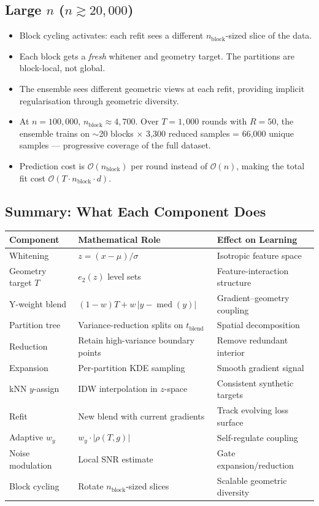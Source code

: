 \documentclass[11pt,a4paper]{article}
\newcommand{\med}{\operatorname{med}}
\theoremstyle{definition}
\begin{document}
\subsection{Large $n$ ($n \gtrsim 20{,}000$)}

\begin{itemize}[nosep]
    \item Block cycling activates: each refit sees a different $n_{\text{block}}$-sized
        slice of the data.
    \item Each block gets a \emph{fresh} whitener and geometry target.  The partitions
        are block-local, not global.
    \item The ensemble sees different geometric views at each refit, providing
        implicit regularisation through geometric diversity.
    \item At $n = 100{,}000$, $n_{\text{block}} \approx 4{,}700$.  Over $T = 1{,}000$ rounds
        with $R = 50$, the ensemble trains on $\sim$20 blocks $\times$ 3{,}300 reduced
        samples = 66{,}000 unique samples --- progressive coverage of the full dataset.
    \item Prediction cost is $\mathcal{O}(n_{\text{block}})$ per round instead of
        $\mathcal{O}(n)$, making the total fit cost $\mathcal{O}(T \cdot n_{\text{block}} \cdot d)$.
\end{itemize}

\subsection{Summary: What Each Component Does}

\begin{center}
\begin{tabular}{lll}
\hline
\textbf{Component} & \textbf{Mathematical Role} & \textbf{Effect on Learning} \\
\hline
Whitening & $z = (x - \mu)/\sigma$ & Isotropic feature space \\
Geometry target $T$ & $e_2(z)$ level sets & Feature-interaction structure \\
Y-weight blend & $(1-w)T + w\,|y - \med(y)|$ & Gradient--geometry coupling \\
Partition tree & Variance-reduction splits on $t_{\text{blend}}$ & Spatial decomposition \\
Reduction & Retain high-variance boundary points & Remove redundant interior \\
Expansion & Per-partition KDE sampling & Smooth gradient signal \\
kNN $y$-assign & IDW interpolation in $z$-space & Consistent synthetic targets \\
Refit & New blend with current gradients & Track evolving loss surface \\
Adaptive $w_y$ & $w_y \cdot |\rho(T, g)|$ & Self-regulate coupling \\
Noise modulation & Local SNR estimate & Gate expansion/reduction \\
Block cycling & Rotate $n_{\text{block}}$-sized slices & Scalable geometric diversity \\
\hline
\end{tabular}
\end{center}
\end{document}
